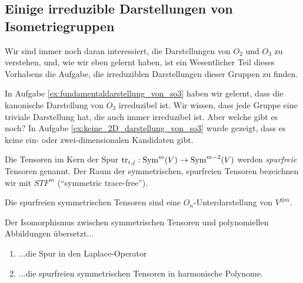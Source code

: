 \subsection{Einige irreduzible Darstellungen von Isometriegruppen}

\begin{remark}
Wir sind immer noch daran interessiert, die Darstellungen von $O_2$ und $O_3$ zu verstehen, und, wie wir eben gelernt haben, ist ein Wesentlicher Teil dieses Vorhabens die Aufgabe, die irreduziblen Darstellungen dieser Gruppen zu finden.

In Aufgabe \ref{ex:fundamentaldarstellung_von_so3} haben wir gelernt, dass die kanonische Darstellung von $O_3$ irreduzibel ist. Wir wissen, dass jede Gruppe eine triviale Darstellung hat, die auch immer irreduzibel ist. Aber welche gibt es noch? In Aufgabe \ref{ex:keine_2D_darstellung_von_so3} wurde gezeigt, dass es keine ein- oder zwei-dimensionalen Kandidaten gibt.
\end{remark}

\begin{definition}
Die Tensoren im Kern der Spur $\operatorname{tr}_{i,j} : \operatorname{Sym}^m(V) \to \operatorname{Sym}^{m-2}(V)$ werden \emph{spurfreie} Tensoren genannt. Der Raum der symmetrischen, spurfreien Tensoren bezeichnen wir mit $STF^m$ (\enquote{symmetric trace-free}).
\end{definition}

\begin{lemma}
Die spurfreien symmetrischen Tensoren sind eine $O_n$-Unterdarstellung von $V^{\otimes m}$.
\end{lemma}

\begin{lemma}
Der Isomorphismus zwischen symmetrischen Tensoren und polynomiellen Abbildungen übersetzt...
\begin{enumerate}
\item ...die Spur in den Laplace-Operator
\item ...die spurfreien symmetrischen Tensoren in harmonische Polynome.
\end{enumerate}
\end{lemma}



